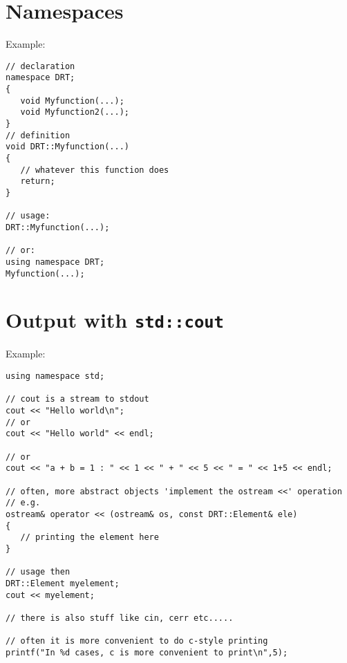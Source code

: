 \section{Namespaces}
Example:\\
\begin{boxedminipage}{\linewidth}
\begin{verbatim}
// declaration
namespace DRT;
{
   void Myfunction(...);
   void Myfunction2(...);
}
// definition
void DRT::Myfunction(...)
{
   // whatever this function does
   return;
}

// usage:
DRT::Myfunction(...);

// or:
using namespace DRT;
Myfunction(...);
\end{verbatim}
\end{boxedminipage}

\section{Output with \texttt{std::cout}}
Example:\\
\begin{boxedminipage}{\linewidth}
\begin{verbatim}
using namespace std;

// cout is a stream to stdout
cout << "Hello world\n";
// or
cout << "Hello world" << endl;

// or
cout << "a + b = 1 : " << 1 << " + " << 5 << " = " << 1+5 << endl;

// often, more abstract objects 'implement the ostream <<' operation
// e.g.
ostream& operator << (ostream& os, const DRT::Element& ele)
{
   // printing the element here
}

// usage then
DRT::Element myelement;
cout << myelement;

// there is also stuff like cin, cerr etc.....

// often it is more convenient to do c-style printing
printf("In %d cases, c is more convenient to print\n",5);
\end{verbatim}
\end{boxedminipage}


